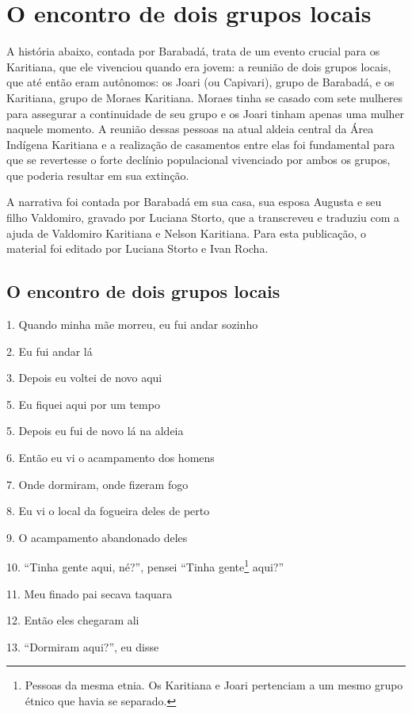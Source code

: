 \chapter{O encontro de dois grupos locais}

A história abaixo, contada por Barabadá, trata de um evento crucial para
os Karitiana, que ele vivenciou quando era jovem: a reunião de dois
grupos locais, que até então eram autônomos: os Joari (ou Capivari),
grupo de Barabadá, e os Karitiana, grupo de Moraes Karitiana. Moraes
tinha se casado com sete mulheres para assegurar a continuidade de seu
grupo e os Joari tinham apenas uma mulher naquele momento. A reunião
dessas pessoas na atual aldeia central da Área Indígena Karitiana e a
realização de casamentos entre elas foi fundamental para que se
revertesse o forte declínio populacional vivenciado por ambos os grupos,
que poderia resultar em sua extinção.

A narrativa foi contada por Barabadá em sua casa, sua esposa Augusta e
seu filho Valdomiro, gravado por Luciana Storto, que a transcreveu e
traduziu com a ajuda de Valdomiro Karitiana e Nelson Karitiana. Para
esta publicação, o material foi editado por Luciana Storto e Ivan Rocha.

\section{O encontro de dois grupos locais}

1. Quando minha mãe morreu, eu fui andar sozinho

2. Eu fui andar lá

3. Depois eu voltei de novo aqui

5. Eu fiquei aqui por um tempo

5. Depois eu fui de novo lá na aldeia

6. Então eu vi o acampamento dos homens

7. Onde dormiram, onde fizeram fogo

8. Eu vi o local da fogueira deles de perto

9. O acampamento abandonado deles

10. ``Tinha gente aqui, né?'', pensei ``Tinha gente\footnote{Pessoas da
  mesma etnia.  Os Karitiana e Joari pertenciam a um mesmo grupo étnico
  que havia se separado.} aqui?''

11. Meu finado pai secava taquara

12. Então eles chegaram ali

13. ``Dormiram aqui?'', eu disse

